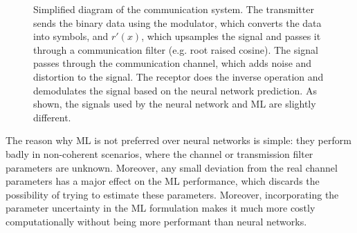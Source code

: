 \documentclass[conference]{IEEEtran}
\begin{document}
\begin{figure}
\caption{Simplified diagram of the communication system. The transmitter sends the binary data using the modulator, which converts the data into symbols, and $r'(x)$, which upsamples the signal and passes it through a communication filter (e.g. root raised cosine). The signal passes through the communication channel, which adds noise and distortion to the signal. The receptor does the inverse operation and demodulates the signal based on the neural network prediction. As shown, the signals used by the neural network and ML are slightly different.}
\label{fig:comm_system}
\end{figure}

The reason why ML is not preferred over neural networks is simple: they perform badly in non-coherent scenarios, where the channel or transmission filter parameters are unknown. Moreover, any small deviation from the real channel parameters has a major effect on the ML performance, which discards the possibility of trying to estimate these parameters. Moreover, incorporating the parameter uncertainty in the ML formulation makes it much more costly computationally without being more performant than neural networks.
\end{document}
